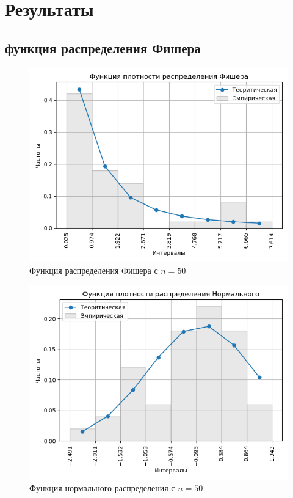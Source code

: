 \documentclass[a4]{article}
\begin{document}
\section{Результаты}
\subsection{функция распределения Фишера}
\begin{center}

\begin{figure}[H]
\caption{Функция распределения Фишера с $ n = 50$}
\includegraphics[width=\textwidth]{output/task1/fisher_50_histogram.png}
\end{figure}

\begin{figure}[H]
\caption{Функция нормального распределения с $ n = 50$}
\includegraphics[width=\textwidth]{output/task1/norm_50_histogram.png}
\end{figure}


\end{center}
\end{document}
